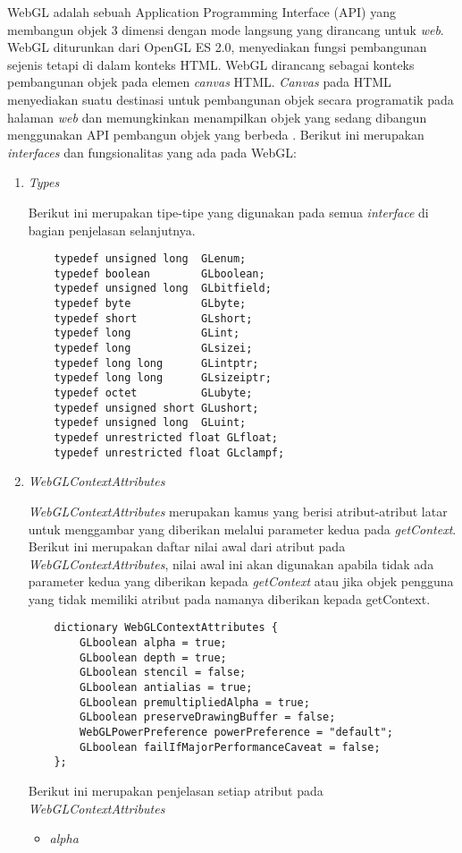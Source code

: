 WebGL adalah sebuah Application Programming Interface (API) yang membangun objek 3 dimensi dengan mode langsung yang dirancang untuk {\it web}. WebGL diturunkan dari OpenGL ES 2.0, menyediakan fungsi pembangunan sejenis tetapi di dalam konteks HTML. WebGL dirancang sebagai konteks pembangunan objek pada elemen {\it canvas} HTML. {\it Canvas} pada HTML menyediakan suatu destinasi untuk pembangunan objek secara programatik pada halaman {\it web} dan memungkinkan menampilkan objek yang sedang dibangun menggunakan API pembangun objek yang berbeda \cite{webgl}. Berikut ini merupakan {\it interfaces} dan fungsionalitas yang ada pada WebGL:
\begin{enumerate}
\item {\it Types}

	Berikut ini merupakan tipe-tipe yang digunakan pada semua {\it interface} di bagian penjelasan selanjutnya.
	\begin{lstlisting}
	typedef unsigned long  GLenum;
	typedef boolean        GLboolean;
	typedef unsigned long  GLbitfield;
	typedef byte           GLbyte;
	typedef short          GLshort;
	typedef long           GLint;
	typedef long           GLsizei;
	typedef long long      GLintptr;
	typedef long long      GLsizeiptr;
	typedef octet          GLubyte;
	typedef unsigned short GLushort;
	typedef unsigned long  GLuint;
	typedef unrestricted float GLfloat;
	typedef unrestricted float GLclampf;
	\end{lstlisting}
	
\item {\it WebGLContextAttributes}

	{\it WebGLContextAttributes} merupakan kamus yang berisi atribut-atribut latar untuk menggambar yang diberikan melalui parameter kedua pada {\it getContext}. Berikut ini merupakan daftar nilai awal dari atribut pada {\it WebGLContextAttributes}, nilai awal ini akan digunakan apabila tidak ada parameter kedua yang diberikan kepada {\it getContext} atau jika objek pengguna yang tidak memiliki atribut pada namanya diberikan kepada getContext.
	\begin{lstlisting}
	dictionary WebGLContextAttributes {
    	GLboolean alpha = true;
    	GLboolean depth = true;
    	GLboolean stencil = false;
    	GLboolean antialias = true;
    	GLboolean premultipliedAlpha = true;
    	GLboolean preserveDrawingBuffer = false;
    	WebGLPowerPreference powerPreference = "default";
    	GLboolean failIfMajorPerformanceCaveat = false;
	};
	\end{lstlisting}
	Berikut ini merupakan penjelasan setiap atribut pada {\it WebGLContextAttributes} 
	\begin{itemize}
	\item {\it alpha}
	

\end{itemize}
\end{enumerate}
